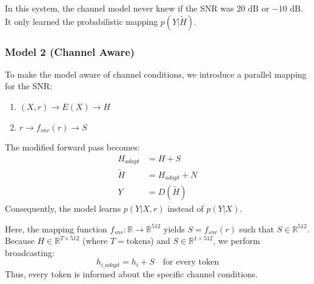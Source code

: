 \documentclass[twocolumn]{article}
\begin{document}
In this system, the channel model never knew if the SNR was $20\text{ dB}$ or $-10\text{ dB}$. It only learned the probabilistic mapping $p(Y|\tilde{H})$.

\subsubsection{\textbf{Model 2 (Channel Aware)}}
To make the model aware of channel conditions, we introduce a parallel mapping for the SNR:
\begin{enumerate}
    \item $(X, r) \rightarrow E(X) \rightarrow H$
    \item $r \rightarrow f_{snr}(r) \rightarrow S$
\end{enumerate}

The modified forward pass becomes:
\begin{align}
    H_{adapt} &= H + S \\
    \tilde{H} &= H_{adapt} + N \\
    Y &= D(\tilde{H})
\end{align}
Consequently, the model learns $p(Y|X, r)$ instead of $p(Y|X)$.

Here, the mapping function $f_{snr}: \mathbb{R} \rightarrow \mathbb{R}^{512}$ yields $S = f_{snr}(r)$ such that $S \in \mathbb{R}^{512}$. Because $H \in \mathbb{R}^{T \times 512}$ (where $T = \text{tokens}$) and $S \in \mathbb{R}^{1 \times 512}$, we perform broadcasting:
\begin{equation}
    h_{i\_adapt} = h_i + S \quad \text{for every token}
\end{equation}
Thus, every token is informed about the specific channel conditions.
\end{document}

